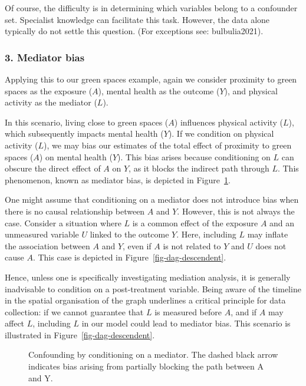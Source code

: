 \documentclass[
  singlecolumn]{article}
\begin{document}
Of course, the difficulty is in determining which variables belong to a
confounder set. Specialist knowledge can facilitate this task. However,
the data alone typically do not settle this question. (For exceptions
see: bulbulia2021).

\subsubsection{3. Mediator bias}\label{mediator-bias}

Applying this to our green spaces example, again we consider proximity
to green spaces as the exposure (\(A\)), mental health as the outcome
(\(Y\)), and physical activity as the mediator (\(L\)).

In this scenario, living close to green spaces (\(A\)) influences
physical activity (\(L\)), which subsequently impacts mental health
(\(Y\)). If we condition on physical activity (\(L\)), we may bias our
estimates of the total effect of proximity to green spaces (\(A\)) on
mental health (\(Y\)). This bias arises because conditioning on \(L\)
can obscure the direct effect of \(A\) on \(Y\), as it blocks the
indirect path through \(L\). This phenomenon, known as mediator bias, is
depicted in Figure~\ref{fig-dag-mediator}.

One might assume that conditioning on a mediator does not introduce bias
when there is no causal relationship between \(A\) and \(Y\). However,
this is not always the case. Consider a situation where \(L\) is a
common effect of the exposure \(A\) and an unmeasured variable \(U\)
linked to the outcome \(Y\). Here, including \(L\) may inflate the
association between \(A\) and \(Y\), even if \(A\) is not related to
\(Y\) and \(U\) does not cause \(A\). This case is depicted in
Figure~\ref{fig-dag-descendent}.

Hence, unless one is specifically investigating mediation analysis, it
is generally inadvisable to condition on a post-treatment variable.
Being aware of the timeline in the spatial organisation of the graph
underlines a critical principle for data collection: if we cannot
guarantee that \(L\) is measured before \(A\), and if \(A\) may affect
\(L\), including \(L\) in our model could lead to mediator bias. This
scenario is illustrated in Figure~\ref{fig-dag-descendent}.

\begin{figure}[htb]


\caption{\label{fig-dag-mediator}Confounding by conditioning on a
mediator. The dashed black arrow indicates bias arising from partially
blocking the path between A and Y.}

\end{figure}%
\end{document}
